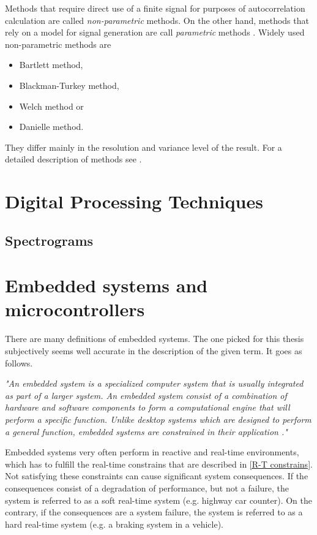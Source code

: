 \documentclass[twoside]{ctuthesis}
\theoremstyle{plain}
\theoremstyle{definition}
\theoremstyle{note}
\begin{document}
Methods that require direct use of a finite signal for purposes of autocorrelation calculation are called \textit{non-parametric} methods. On the other hand, methods that rely on a model for signal generation are call \textit{parametric} methods \cite{cite:RT_DSP}. Widely used non-parametric methods are

\begin{itemize}
	\setlength{\itemsep}{5pt}
\item Bartlett method,
\item Blackman-Turkey method,
\item Welch method or
\item Danielle method.
\end{itemize}

They differ mainly in the resolution and variance level of the result. For a detailed description of methods see \cite{cite:2}.

\section{Digital Processing Techniques}

\subsection{Spectrograms}

\section{Embedded systems and microcontrollers}
There are many definitions of embedded systems. The one picked for this thesis subjectively seems well accurate in the description of the given term. It goes as follows.

\textit{"An embedded system is a specialized computer system that is usually integrated as part of a larger system. An embedded system consist of a combination of hardware and software components to form a computational engine that will perform a specific function. Unlike desktop systems which are designed to perform a general function, embedded systems are constrained in their application \cite{cite:SE_for_ES}."}

Embedded systems very often perform in reactive and real-time environments, which has to fulfill the real-time constrains that are described in \ref{R-T constrains}. Not satisfying these constraints can cause significant system consequences. If the consequences consist of a degradation of performance, but not a failure, the system is referred to as a soft real-time system (e.g. highway car counter). On the contrary, if the consequences are a system failure, the system is referred to as a hard real-time system (e.g. a braking system in a vehicle). 
\end{document}
